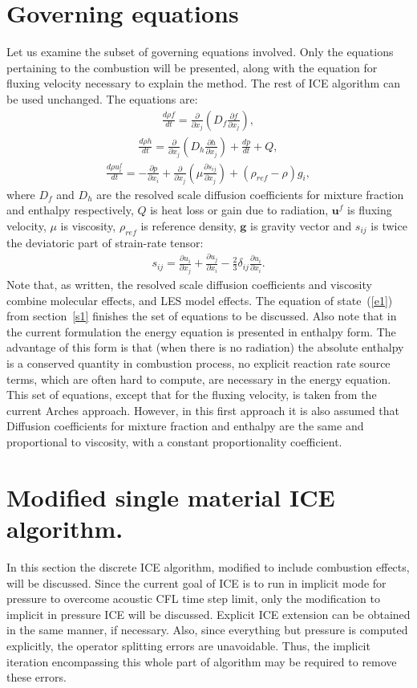 \documentclass[fleqn,reqno]{amsart}
\newcommand{\pdd}[2]{\frac{\partial{#1}}{\partial{#2}}}
\newcommand{\ldd}[2]{\frac{d{#1}}{d{#2}}}
\begin{document}
\section{Governing equations}
\label{s2}
Let us examine the subset of governing equations involved. Only the equations
pertaining to the combustion will be presented, along with the equation for
fluxing velocity necessary to explain the method. The rest of ICE algorithm
can be used unchanged. The equations are: 
\begin{align}
\label{e4}
\ldd{\rho f}{t}=\pdd{}{x_j}\left(D_f \pdd{f}{x_j}\right),
\end{align}
\begin{align}
\label{e5}
\ldd{\rho h}{t}=\pdd{}{x_j}\left(D_h \pdd{h}{x_j}\right)+\ldd{p}{t}+Q,
\end{align}
\begin{align}
\label{e6}
\ldd{\rho u^f_i}{t}=-\pdd{p}{x_i}+\pdd{}{x_j}\left(\mu \pdd{s_{ij}}{x_j}\right)+(\rho_{ref}-\rho)g_i,
\end{align}
where $D_f$ and $D_h$ are the resolved scale diffusion coefficients for mixture fraction and enthalpy respectively,
$Q$ is heat loss or gain due to radiation, $\boldsymbol{u}^f$ is fluxing velocity, $\mu$ is viscosity,
$\rho_{ref}$ is reference density, $\boldsymbol{g}$ is gravity vector and $s_{ij}$ is twice the deviatoric
part of strain-rate tensor:
\begin{align}
\label{e7}
s_{ij}=\pdd{u_i}{x_j}+\pdd{u_j}{x_i}-\frac{2}{3}\delta_{ij}\pdd{u_i}{x_i}.
\end{align}
Note that, as written, the resolved scale diffusion coefficients and viscosity combine molecular effects, and LES model effects.
The equation of state~(\ref{e1}) from section~\ref{s1} finishes the set of equations to be discussed.
Also note that in the current formulation
the energy equation is presented in enthalpy form. The advantage of this form is that
(when there is no radiation) the absolute enthalpy is a conserved quantity in combustion process,
no explicit reaction rate source terms, which are often hard to compute,
are necessary in the energy equation. This set of equations, except that for the
fluxing velocity, is taken from the current Arches approach. However, in this first approach
it is also assumed that Diffusion coefficients for mixture fraction and enthalpy
are the same and proportional to viscosity, with a constant proportionality
coefficient.

\section{Modified single material ICE algorithm.}
\label{s3}
In this section the discrete ICE algorithm, modified to include combustion effects,
will be discussed. Since the current goal of ICE is to run in implicit
mode for pressure to overcome acoustic CFL time step limit, only the modification
to implicit in pressure ICE will be discussed. Explicit ICE extension can be
obtained in the same manner, if necessary. Also, since everything but pressure
is computed explicitly, the operator splitting errors are unavoidable. Thus,
the implicit iteration encompassing this whole part of algorithm may be
required to remove these errors.
\end{document}
